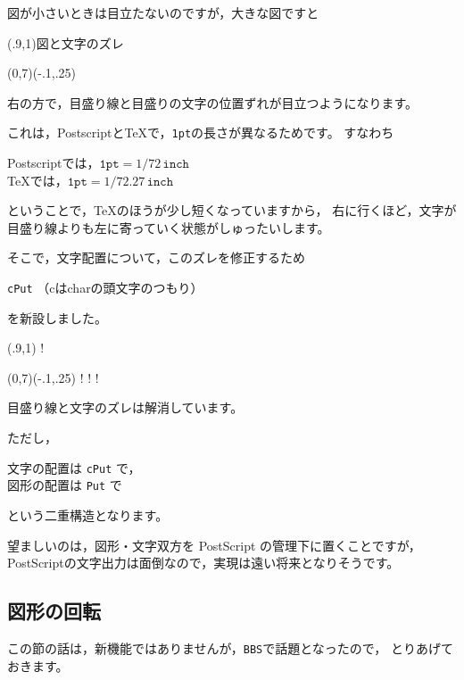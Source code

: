 \documentclass[a4j]{jarticle}
\begin{document}
図が小さいときは目立たないのですが，大きな図ですと

\begin{showEx}(.9,1){図と文字のズレ}
\begin{pszahyou*}[ul=19mm](0,7)(-.1,.25)
  \Drawline{\XMIN\XMAX}%
  \Ifor{}%
\end{pszahyou*}
\end{showEx}

\noindent
右の方で，目盛り線と目盛りの文字の位置ずれが目立つようになります。

これは，\textsf{Postscript}と\TeX で，\texttt{1pt}の長さが異なるためです。
すなわち
\begin{jquote}
  \textsf{Postscript}では，$\mathtt{1pt}=1/72\,\mathtt{inch}$\\
  \TeX では，$\mathtt{1pt}=1/72.27\,\mathtt{inch}$
\end{jquote}
ということで，\TeX のほうが少し短くなっていますから，
右に行くほど，文字が目盛り線よりも左に寄っていく状態がしゅったいします。

そこで，文字配置について，このズレを修正するため
\begin{jquote}
  \verb+cPut+ （cはcharの頭文字のつもり）
\end{jquote}
を新設しました。

\begin{showpEx}(.9,1){}
!\begin{pszahyou*}[ul=19mm](0,7)(-.1,.25)
! \Drawline{\XMIN\XMAX}%
! \Ifor{}%
!\end{pszahyou*}
\end{showpEx}

目盛り線と文字のズレは解消しています。

ただし，
\begin{jquote}
  文字の配置は \verb+cPut+ で，\\
  図形の配置は \verb+Put+ で
\end{jquote}
という二重構造となります。

望ましいのは，図形・文字双方を \textsf{PostScript} の管理下に置くことですが，
\textsf{PostScript}の文字出力は面倒なので，実現は遠い将来となりそうです。

\subsection{図形の回転}
この節の話は，新機能ではありませんが，\texttt{BBS}で話題となったので，
とりあげておきます。
\end{document}
